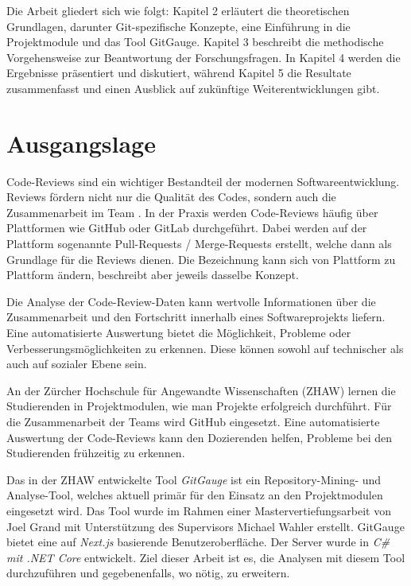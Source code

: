 Die Arbeit gliedert sich wie folgt: Kapitel 2 erläutert die theoretischen Grundlagen, darunter Git-spezifische Konzepte, eine Einführung in die Projektmodule und das Tool GitGauge. Kapitel 3 beschreibt die methodische Vorgehensweise zur Beantwortung der Forschungsfragen. In Kapitel 4 werden die Ergebnisse präsentiert und diskutiert, während Kapitel 5 die Resultate zusammenfasst und einen Ausblick auf zukünftige Weiterentwicklungen gibt.

\label{Chapter1} %


\section{Ausgangslage}
\label{sec:Ausgangslage} 
Code-Reviews sind ein wichtiger Bestandteil der modernen Softwareentwicklung. Reviews fördern nicht nur die Qualität des Codes, sondern auch die Zusammenarbeit im Team \parencite{dos_santos_investigating_2018}. In der Praxis werden Code-Reviews häufig über Plattformen wie GitHub oder GitLab durchgeführt. Dabei werden auf der Plattform sogenannte Pull-Requests / Merge-Requests erstellt, welche dann als Grundlage für die Reviews dienen. Die Bezeichnung kann sich von Plattform zu Plattform ändern, beschreibt aber jeweils dasselbe Konzept. \parencite{kansab_analyzing_2025}


Die Analyse der Code-Review-Daten kann wertvolle Informationen über die Zusammenarbeit und den Fortschritt innerhalb eines Softwareprojekts liefern. Eine automatisierte Auswertung bietet die Möglichkeit, Probleme oder Verbesserungsmöglichkeiten zu erkennen. Diese können sowohl auf technischer als auch auf sozialer Ebene sein. 

An der Zürcher Hochschule für Angewandte Wissenschaften (ZHAW) lernen die Studierenden in Projektmodulen, wie man Projekte erfolgreich durchführt. Für die Zusammenarbeit der Teams wird GitHub eingesetzt. Eine automatisierte Auswertung der Code-Reviews kann den Dozierenden helfen, Probleme bei den Studierenden frühzeitig zu erkennen.

Das in der ZHAW entwickelte Tool \textit{GitGauge} ist ein Repository-Mining- und Analyse-Tool, welches aktuell primär für den Einsatz an den Projektmodulen eingesetzt wird. Das Tool wurde im Rahmen einer Mastervertiefungsarbeit von Joel Grand mit Unterstützung des Supervisors Michael Wahler erstellt. GitGauge bietet eine auf \textit{Next.js} basierende Benutzeroberfläche. Der Server wurde in \textit{C\# mit .NET Core } entwickelt. Ziel dieser Arbeit ist es, die Analysen mit diesem Tool durchzuführen und gegebenenfalls, wo nötig, zu erweitern. \parencite{grand_joel_wahler_michael_waspe_lara_stumpf_simon_repo_nodate}

